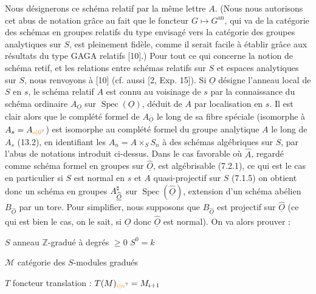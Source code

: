 Nous désignerons ce schéma relatif par la même lettre $A$. (Nous nous autorisons cet abus de notation grâce au fait que le foncteur $G\mapsto G^{\mathrm{an}}$, qui va de la catégorie des schémas en groupes relatifs du type envisagé vers la catégorie des groupes analytiques sur $S$, est pleinement fidèle, comme il serait facile à établir grâce aux résultats du type GAGA relatifs [10].) Pour tout ce qui concerne la notion de schéma retif, et les relations entre schémas relatifs sur $S$ et espaces analytiques sur $S$, nous renvoyons à [10] (cf. aussi [2, Exp. 15]). Si $\underline O$ désigne l'anneau local de $S$ en $s$, le schéma relatif $A$ est connu au voisinage de $s$ par la connaissance du schéma ordinaire $A_{\underline O}$ sur $\operatorname{Spec}(\underline O)$, déduit de $A$ par localisation en $s$. Il est clair alors que le complété formel de $A_{\underline O}$ le long de sa fibre spéciale (isomorphe à $A_s=A_{\unsure{o|0}}$) est isomorphe au complété formel du groupe analytique $A$ le long de $A_s$ (13.2), en identifiant les $A_n=A\times_S S_n$ à des schémas algébriques sur $S$, par l'abus de notations introduit ci-dessus. Dans le cas favorable où $\widehat A$, regardé comme schéma formel en groupes sur $\widehat{\underline O}$, est algébrisable (7.2.1), ce qui est le cas en particulier si $S$ est normal en $s$ et $A$ quasi-projectif sur $S$ (7.1.5) on obtient donc un schéma en groupes $A^{\natural}_{\widehat{\underline O}}$ sur $\operatorname{Spec}(\widehat{\underline O})$, extension d'un schéma abélien $B_{\widehat{\underline O}}$ par un tore. Pour simplifier, nous supposons que $B_{\widehat{\underline O}}$ est projectif sur $\widehat{\underline O}$ (ce qui est bien le cas, on le sait, si $\underline O$ donc $\widehat{\underline O}$ est normal). On va alors prouver :






$S$ anneau $\mathbb Z$-gradué  à degrés $\geq0$ \quad $S^0=k$

$\mathcal M$ catégorie des $S$-modules gradués

\textcircled{$T$} foncteur translation : $T(M)_{\unsure{i|n}}=M_{i+1}$ 

